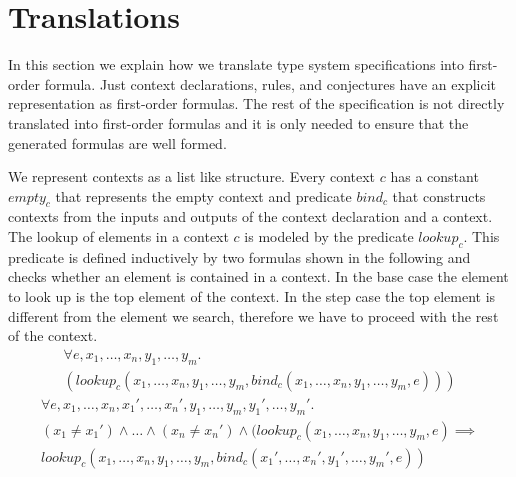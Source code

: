 \section{Translations}
\label{sec:translations}
In this section we explain how we translate type system specifications
into first-order formula. Just context declarations, rules, and
conjectures have an explicit representation as first-order
formulas. The rest of the specification is not directly translated
into first-order formulas and it is only needed to ensure that the
generated formulas are well formed.

We represent contexts as a list like structure. Every context $c$ has
a constant $empty_c$ that represents the empty context and predicate
$bind_c$ that constructs contexts from the inputs and outputs of the
context declaration and a context. The lookup of elements in a
context $c$ is modeled by the predicate $lookup_c$. This predicate is
defined inductively by two formulas shown in the following and checks
whether an element is contained in a context. In the base case the
element to look up is the top element of the context. In the step case
the top element is different from the element we search, therefore we
have to proceed with the rest of the context.
\begin{multline}
  \forall e, x_1, \dots, x_n, y_1, \dots, y_m . \\
  (lookup_c(x_1,\dots,x_n,y_1,\dots,y_m,
  bind_c(x_1,\dots,x_n,y_1,\dots,y_m,e)))
\label{formula:context-base}
\end{multline}
\begin{multline}
  \forall e, x_1, \dots, x_n, x_1', \dots, x_n', y_1, \dots, y_m,
  y_1', \dots,
  y_m' . \\
  (x_1 \neq x_1') \land \dots \land (x_n \neq x_n') \land (lookup_c(x_1,
  \dots, x_n, y_1, \dots, y_m, e) \implies \\ lookup_c(x_1, \dots, x_n,
  y_1, \dots, y_m, bind_c(x_1',\dots,x_n',y_1',\dots,y_m',e))
\label{formula:context-step}
\end{multline}

